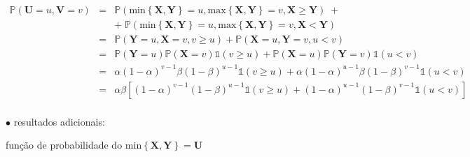\documentclass[a4paper, 11pt]{article}
\begin{document}
\begin{equation*}
\begin{array}{lclll}
\mathds{P}(\mathbf{U} = u, \mathbf{V} = v) & = &  \mathds{P}(\mathrm{min}\left\{ \mathbf{X}, \mathbf{Y} \right\} = u, \mathrm{max}\left\{ \mathbf{X}, \mathbf{Y} \right\} = v, \mathbf{X} \geq \mathbf{Y}) \; +  \\
&  & + \; \mathds{P}(\mathrm{min}\left\{ \mathbf{X}, \mathbf{Y} \right\} = u, \mathrm{max}\left\{ \mathbf{X}, \mathbf{Y} \right\} = v, \mathbf{X} < \mathbf{Y}) \\

& = & \mathds{P}(\mathbf{Y} = u, \mathbf{X} = v, v \geq u) + \mathds{P}(\mathbf{X} = u, \mathbf{Y} = v, u < v) \\

& = & \mathds{P}(\mathbf{Y} = u) \mathds{P}(\mathbf{X} = v) \mathds{1}( v \geq u) + \mathds{P}(\mathbf{X} = u) \mathds{P}(\mathbf{Y} = v) \mathds{1}(u < v) \\
& = & \alpha(1-\alpha)^{v-1}\beta(1-\beta)^{u-1}\mathds{1}( v \geq u) + \alpha(1-\alpha)^{u-1}\beta(1-\beta)^{v-1}\mathds{1}(u<v) \\

& = & \alpha\beta \left[ (1-\alpha)^{v-1}(1-\beta)^{u-1}\mathds{1}( v \geq u) + (1-\alpha)^{u-1}(1-\beta)^{v-1}\mathds{1}(u<v) \right]\\

\end{array}
\end{equation*}

\noindent
$\bullet$ resultados adicionais:

função de probabilidade do $\mathrm{min}\left\{ \mathbf{X}, \mathbf{Y}\right\} = \mathbf{U}$
\end{document}
